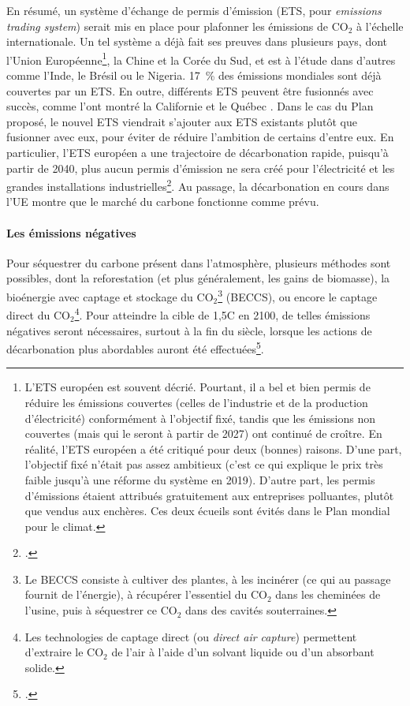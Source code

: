 \documentclass[a5paper,french,openany]{memoir}
\begin{document}
En résumé, un système d'échange de permis d'émission (ETS, pour \textit{emissions trading system}) serait mis en place pour plafonner les émissions de CO$_\text{2}$ à l'échelle internationale. 
Un tel système a déjà fait ses preuves dans plusieurs pays, dont l'Union Européenne\footnote{L'ETS européen est souvent décrié. Pourtant, il a bel et bien permis de réduire les émissions couvertes (celles de l'industrie et de la production d'électricité) conformément à l'objectif fixé, tandis que les émissions non couvertes (mais qui le seront à partir de 2027) ont continué de croître. En réalité, l'ETS européen a été critiqué pour deux (bonnes) raisons. D'une part, l'objectif fixé n'était pas assez ambitieux (c'est ce qui explique le prix très faible jusqu'à une réforme du système en 2019). D'autre part, les permis d'émissions étaient attribués gratuitement aux entreprises polluantes, plutôt que vendus aux enchères. Ces deux écueils sont évités dans le Plan mondial pour le climat.}, la Chine et la Corée du Sud, et est à l'étude dans d'autres comme l'Inde, le Brésil ou le Nigeria. 17~\% des émissions mondiales sont déjà couvertes par un ETS. En outre, différents ETS peuvent être fusionnés avec succès, comme l'ont montré la Californie et le Québec \citep{icap_emissions_2023}. Dans le cas du Plan proposé, le nouvel ETS viendrait s'ajouter aux ETS existants plutôt que fusionner avec eux, pour éviter de réduire l'ambition de certains d'entre eux. En particulier, l'ETS européen a une trajectoire de décarbonation rapide, puisqu'à partir de 2040, plus aucun permis d'émission ne sera créé pour l'électricité et les grandes installations industrielles\footnote{\cite{pahle_emerging_2023}.}. Au passage, la décarbonation en cours dans l'UE montre que le marché du carbone fonctionne comme prévu.

\paragraph{Les émissions négatives}
Pour séquestrer du carbone présent dans l'atmosphère, plusieurs méthodes sont possibles, dont la reforestation (et plus généralement, les gains de biomasse), la bioénergie avec captage et stockage du CO$_\text{2}$\footnote{Le BECCS consiste à cultiver des plantes, à les incinérer (ce qui au passage fournit de l'énergie), à récupérer l'essentiel du CO$_\text{2}$ dans les cheminées de l'usine, puis à séquestrer ce CO$_\text{2}$ dans des cavités souterraines.} (BECCS), ou encore le captage direct du CO$_\text{2}$\footnote{Les technologies de captage direct (ou \textit{direct air capture}) permettent d'extraire le CO$_\text{2}$ de l'air à l'aide d'un solvant liquide ou d'un absorbant solide.}. Pour atteindre la cible de 1,5\textdegree{}C en 2100, de telles émissions négatives seront nécessaires, surtout à la fin du siècle, lorsque les actions de décarbonation plus abordables auront été effectuées\footnote{\cite{minx_negative_2018}.}. 
\end{document}
